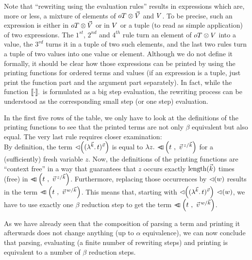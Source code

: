 \documentclass[submission,copyright,creativecommons]{eptcs}
\begin{document}
Note that ``rewriting using the evaluation rules'' results in expressions which are, more or less, a mixture of elements of $\ot \otimes \vl$ and $\va$. To be precise, such an expression is either in $\ot \otimes \vl$ or in $\va$ or a tuple (to read as simple application) of two expressions. The $1^{st}$, $2^{nd}$ and $4^{th}$ rule turn an element of $\ot \otimes \va$ into a value, the $3^{rd}$ turns it in a tuple of two such elements, and the last two rules turn a tuple of two values into one value or element. 
Although we do not define it formally, it should be clear how those expressions can be printed by using the printing functions for ordered terms and values (if an expression is a tuple, just print the function part and the argument part separately). In fact, while the function $\ev \cdot \cdot$ is formulated as a big step evaluation, the rewriting process can be understood as the corresponding small step (or one step) evaluation.

In the first five rows of the table, we only have to look at the definitions of the printing functions to see that the printed terms are not only $\beta$ equivalent but also equal. The very last rule requires closer examination: 
\\
By definition, the term $\prVal{\Val{\vec k} t {\vec v}}$ is equal to $\LaA z {\pr {t} {  \multiinsert{\vec v}{\vec k}{z}   }} $ for a (sufficiently) fresh variable $z$. Now, the definitions of the printing functions are ``context free'' in a way that guarantees  that $z$ occurs exactly $\length{\vec k}$ times (free) in $\pr {t} {  \multiinsert{\vec v}{\vec k}{z}   }$. Furthermore, replacing those occurrences by $\prVal{w}$ results in the term $\pr{t}{\multiinsert{\vec v}{\vec k}{w}}$. This means that, starting with 
$ \ApA{\prVal{\Val{\vec k} t {\vec v}}}{\prVal w}  $,
we have to use exactly one $\beta$ reduction step to get the term $  \pr{t}{\multiinsert{\vec v}{\vec k}{w}}  $.

As we have already seen that the composition of parsing a term and printing it afterwards does not change anything (up to $\alpha$ equivalence), we can now conclude that parsing, evaluating (a finite number of rewriting steps) and printing is equivalent to a number of $\beta$ reduction steps.
\end{document}
